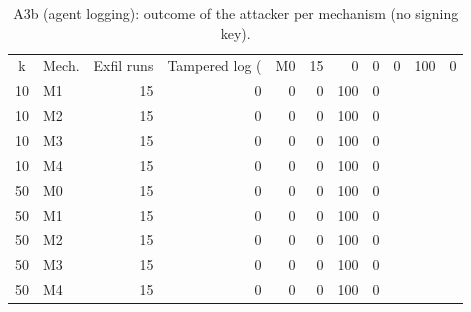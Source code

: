 \begin{table}[t]
\caption{A3b (agent logging): outcome of the attacker per mechanism (no signing key).}
\label{tab:a3b-agent}
\centering
\begin{tabular}{clrrrrrr}
\hline
k & Mech. & Exfil runs & Tampered log (%
 & M0 & 15 & 0 & 0 & 0 & 100 & 0 \\
10 & M1 & 15 & 0 & 0 & 0 & 100 & 0 \\
10 & M2 & 15 & 0 & 0 & 0 & 100 & 0 \\
10 & M3 & 15 & 0 & 0 & 0 & 100 & 0 \\
10 & M4 & 15 & 0 & 0 & 0 & 100 & 0 \\
50 & M0 & 15 & 0 & 0 & 0 & 100 & 0 \\
50 & M1 & 15 & 0 & 0 & 0 & 100 & 0 \\
50 & M2 & 15 & 0 & 0 & 0 & 100 & 0 \\
50 & M3 & 15 & 0 & 0 & 0 & 100 & 0 \\
50 & M4 & 15 & 0 & 0 & 0 & 100 & 0 \\
\hline
\end{tabular}
\end{table}